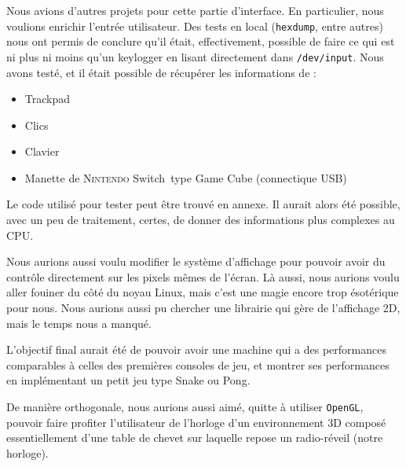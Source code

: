 \documentclass[10pt,a4paper,notitlepage ]{article}
\begin{document}
	Nous avions d'autres projets pour cette partie d'interface. En particulier, nous voulions enrichir l'entrée utilisateur. Des tests en local (\texttt{hexdump}, entre autres) nous ont permis de conclure qu'il était, effectivement, possible de faire ce qui est ni plus ni moins qu'un keylogger en lisant directement dans \texttt{/dev/input}. Nous avons testé, et il était possible de récupérer les informations de :
	\begin{itemize}
		\item Trackpad
		\item Clics
		\item Clavier
		\item Manette de \textsc{Nintendo} Switch\texttrademark\ type Game Cube (connectique USB)
	\end{itemize}
	
	Le code utilisé pour tester peut être trouvé en annexe.
	Il aurait alors été possible, avec un peu de traitement, certes, de donner des informations plus complexes au CPU. 
	
	Nous aurions aussi voulu modifier le système d'affichage pour pouvoir avoir du contrôle directement sur les pixels mêmes de l'écran. Là aussi, nous aurions voulu aller fouiner du côté du noyau Linux, mais c'est une magie encore trop ésotérique pour nous. Nous aurions aussi pu chercher une librairie qui gère de l'affichage 2D, mais le temps nous a manqué.
	
	L'objectif final aurait été de pouvoir avoir une machine qui a des performances comparables à celles des premières consoles de jeu, et montrer ses performances en implémentant un petit jeu type Snake ou Pong.
	
	De manière orthogonale, nous aurions aussi aimé, quitte à utiliser \texttt{OpenGL}, pouvoir faire profiter l'utilisateur de l'horloge d'un environnement 3D composé essentiellement d'une table de chevet sur laquelle repose un radio-réveil (notre horloge).
	
\end{document}
